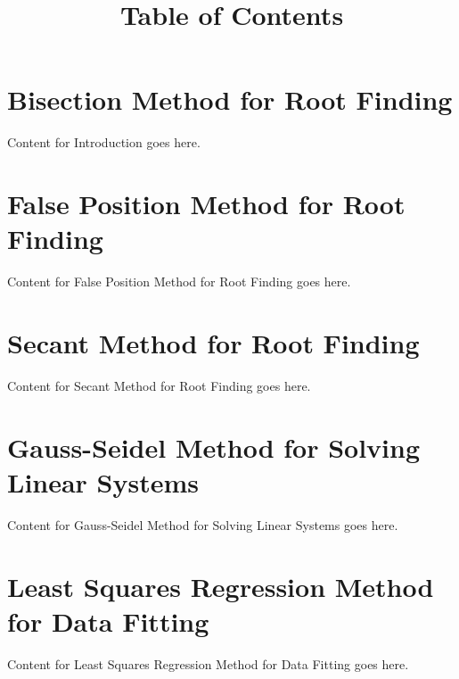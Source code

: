 \documentclass{article}
\begin{document}
\title{Table of Contents}
\author{}
\date{}
\maketitle

\setcounter{page}{1} %
\tableofcontents
\clearpage


\section*{Bisection Method for Root Finding}
\setcounter{page}{1} %
Content for Introduction goes here.
\clearpage

\section*{False Position Method for Root Finding}
\setcounter{page}{2} %
Content for False Position Method for Root Finding goes here.
\clearpage

\section*{Secant Method for Root Finding}
\setcounter{page}{3} %
Content for Secant Method for Root Finding goes here.
\clearpage

\section*{Gauss-Seidel Method for Solving Linear Systems}
\setcounter{page}{4} %
Content for Gauss-Seidel Method for Solving Linear Systems goes here.
\clearpage

\section*{Least Squares Regression Method for Data Fitting}
\setcounter{page}{5} %
Content for Least Squares Regression Method for Data Fitting goes here.
\clearpage
\end{document}
